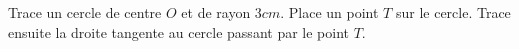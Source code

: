 %
%
Trace un cercle de centre $O$ et de rayon $3cm$. Place un point $T$ sur le cercle. Trace ensuite la droite tangente au cercle passant par le point $T$.
